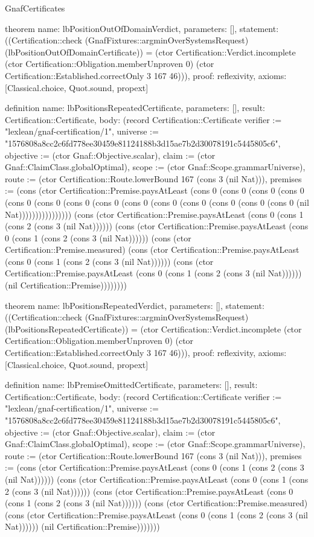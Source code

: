 \begin{lexlean}{GnafCertificates}
\begin{semanticmodule}
theorem{
  name: lbPositionOutOfDomainVerdict,
  parameters: [],
  statement: ((Certification::check (GnafFixtures::argminOverSystemsRequest) (lbPositionOutOfDomainCertificate)) = (ctor Certification::Verdict.incomplete (ctor Certification::Obligation.memberUnproven 0) (ctor Certification::Established.correctOnly 3 167 46))),
  proof: reflexivity{},
  axioms: [Classical.choice, Quot.sound, propext]
}

definition{
  name: lbPositionsRepeatedCertificate,
  parameters: [],
  result: Certification::Certificate,
  body: (record Certification::Certificate {verifier := "lexlean/gnaf-certification/1", universe := "1576808a8cc2c6fd778ee30459e81124188b3d15ae7b2d30078191c5445805c6", objective := (ctor Gnaf::Objective.scalar), claim := (ctor Gnaf::ClaimClass.globalOptimal), scope := (ctor Gnaf::Scope.grammarUniverse), route := (ctor Certification::Route.lowerBound 167 (cons 3 (nil Nat))), premises := (cons (ctor Certification::Premise.paysAtLeast (cons 0 (cons 0 (cons 0 (cons 0 (cons 0 (cons 0 (cons 0 (cons 0 (cons 0 (cons 0 (cons 0 (cons 0 (cons 0 (cons 0 (nil Nat)))))))))))))))) (cons (ctor Certification::Premise.paysAtLeast (cons 0 (cons 1 (cons 2 (cons 3 (nil Nat)))))) (cons (ctor Certification::Premise.paysAtLeast (cons 0 (cons 1 (cons 2 (cons 3 (nil Nat)))))) (cons (ctor Certification::Premise.measured) (cons (ctor Certification::Premise.paysAtLeast (cons 0 (cons 1 (cons 2 (cons 3 (nil Nat)))))) (cons (ctor Certification::Premise.paysAtLeast (cons 0 (cons 1 (cons 2 (cons 3 (nil Nat)))))) (nil Certification::Premise)))))))})
}

theorem{
  name: lbPositionsRepeatedVerdict,
  parameters: [],
  statement: ((Certification::check (GnafFixtures::argminOverSystemsRequest) (lbPositionsRepeatedCertificate)) = (ctor Certification::Verdict.incomplete (ctor Certification::Obligation.memberUnproven 0) (ctor Certification::Established.correctOnly 3 167 46))),
  proof: reflexivity{},
  axioms: [Classical.choice, Quot.sound, propext]
}

definition{
  name: lbPremiseOmittedCertificate,
  parameters: [],
  result: Certification::Certificate,
  body: (record Certification::Certificate {verifier := "lexlean/gnaf-certification/1", universe := "1576808a8cc2c6fd778ee30459e81124188b3d15ae7b2d30078191c5445805c6", objective := (ctor Gnaf::Objective.scalar), claim := (ctor Gnaf::ClaimClass.globalOptimal), scope := (ctor Gnaf::Scope.grammarUniverse), route := (ctor Certification::Route.lowerBound 167 (cons 3 (nil Nat))), premises := (cons (ctor Certification::Premise.paysAtLeast (cons 0 (cons 1 (cons 2 (cons 3 (nil Nat)))))) (cons (ctor Certification::Premise.paysAtLeast (cons 0 (cons 1 (cons 2 (cons 3 (nil Nat)))))) (cons (ctor Certification::Premise.paysAtLeast (cons 0 (cons 1 (cons 2 (cons 3 (nil Nat)))))) (cons (ctor Certification::Premise.measured) (cons (ctor Certification::Premise.paysAtLeast (cons 0 (cons 1 (cons 2 (cons 3 (nil Nat)))))) (nil Certification::Premise))))))})
}


\end{semanticmodule}
\end{lexlean}
